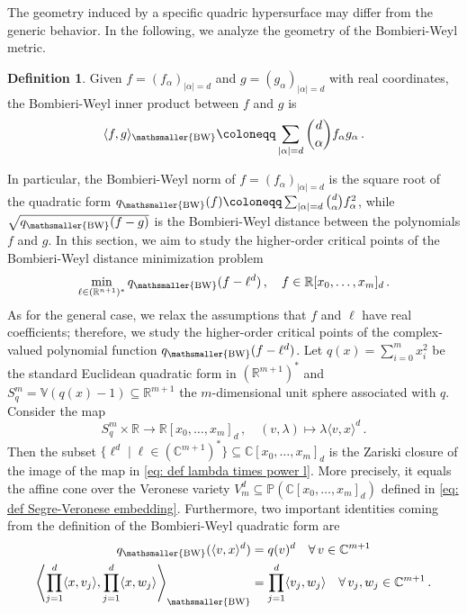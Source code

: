 \documentclass[11pt,reqno]{amsart}
\numberwithin{equation}{section}
\theoremstyle{plain}
\numberwithin{theorem}{section}
\theoremstyle{definition}
\newtheorem{definition}[theorem]{Definition}
\renewcommand{\P}{\mathbb{P}}
\newcommand{\R}{\mathbb{R}}
\newcommand{\C}{\mathbb{C}}
\newcommand{\V}{\mathbb{V}}
\newcommand{\mBW}{\mathsmaller{\mathrm{BW}}}
\begin{document}
The geometry induced by a specific quadric hypersurface may differ from the generic behavior. In the following, we analyze the geometry of the Bombieri-Weyl metric.

\begin{definition}\label{def: BW inner product}
Given $f=(f_\alpha)_{|\alpha|=d}$ and $g=(g_\alpha)_{|\alpha|=d}$ with real coordinates, the Bombieri-Weyl inner product between $f$ and $g$ is 
\[
\langle f,g\rangle_\mBW\coloneqq \sum_{|\alpha|=d}\binom{d}{\alpha}f_\alpha g_\alpha\,.
\]    
\end{definition}

In particular, the Bombieri-Weyl norm of $f=(f_\alpha)_{|\alpha|=d}$ is the square root of the quadratic form $q_\mBW(f) \coloneqq \sum_{|\alpha|=d}\binom{d}{\alpha}f_\alpha^2$, while $\sqrt{q_\mBW(f-g)}$ is the Bombieri-Weyl distance between the polynomials $f$ and $g$. In this section, we aim to study the higher-order critical points of the Bombieri-Weyl distance minimization problem
\begin{equation}\label{eq: rank one approx problem}
   \min_{\ell\in(\R^{n+1})^*}q_\mBW(f-\ell^d)\,,\quad f\in \R[x_0,\dots,x_m]_d\,.
\end{equation}
As for the general case, we relax the assumptions that $f$ and $\ell$ have real coefficients; therefore, we study the higher-order critical points of the complex-valued polynomial function $q_\mBW(f-\ell^d)$. Let $q(x)=\sum_{i=0}^mx_i^2$ be the standard Euclidean quadratic form in $(\R^{m+1})^*$ and $S_q^m=\V(q(x)-1)\subseteq\R^{m+1}$ the $m$-dimensional unit sphere associated with $q$. Consider the map
\begin{equation}\label{eq: def lambda times power l}
    S_q^m\times \R \longrightarrow \R[x_0,\dots,x_m]_d\,,\quad (v,\lambda)\mapsto \lambda\langle v, x\rangle^d\,.
\end{equation}
Then the subset $\{\ell^d\mid \ell\in (\C^{m+1})^*\}\subseteq \C[x_0,\dots,x_m]_d$ is the Zariski closure of the image of the map in \eqref{eq: def lambda times power l}. More precisely, it equals the affine cone over the Veronese variety $V_m^d\subseteq\P(\C[x_0,\dots,x_m]_d)$ defined in \eqref{eq: def Segre-Veronese embedding}. Furthermore, two important identities coming from the definition of the Bombieri-Weyl quadratic form are
\begin{align}\label{eq: identity BW quadratic forms}
\begin{split}
    q_\mBW(\langle v, x\rangle^d) &= q(v)^d\quad\forall\,v\in\C^{m+1}\\
    \left\langle\prod_{j=1}^d\langle x,v_j\rangle,\prod_{j=1}^d\langle x,w_j\rangle\right\rangle_\mBW &= \prod_{j=1}^d\langle v_j,w_j\rangle\quad\forall\,v_j,w_j\in\C^{m+1}\,.
\end{split}
\end{align}
\end{document}
